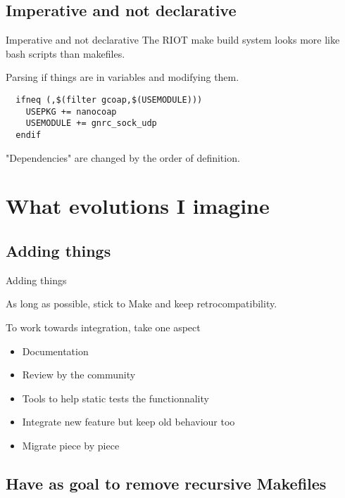\documentclass[ucs,9pt]{beamer}
\begin{document}
\subsection{Imperative and not declarative}

\begin{frame}[fragile]{Imperative and not declarative}
  The RIOT make build system looks more like bash scripts than makefiles.

  Parsing if things are in variables and modifying them.

  \begin{lstlisting}
  ifneq (,$(filter gcoap,$(USEMODULE)))
    USEPKG += nanocoap
    USEMODULE += gnrc_sock_udp
  endif
  \end{lstlisting}

  "Dependencies" are changed by the order of definition.

\end{frame}


\section{What evolutions I imagine}

\subsection{Adding things}

\begin{frame}{Adding things}

  As long as possible, stick to Make and keep retrocompatibility.

  \bigskip

  To work towards integration, take one aspect

  \begin{itemize}
    \item
      Documentation
    \item
      Review by the community
    \item
      Tools to help static tests the functionnality
    \item
      Integrate new feature but keep old behaviour too
    \item
      Migrate piece by piece
  \end{itemize}

\end{frame}


\subsection{Have as goal to remove recursive Makefiles}
\end{document}
